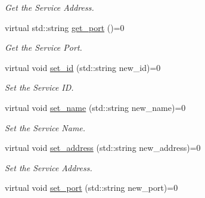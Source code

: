 \begin{DoxyCompactItemize}
\begin{DoxyCompactList}\small\item\em Get the Service Address. \end{DoxyCompactList}\item 
\hypertarget{classServiceInterface_a7c8a328711f7fb019a9f7dadcb897cb0}{virtual std\-::string \hyperlink{classServiceInterface_a7c8a328711f7fb019a9f7dadcb897cb0}{get\-\_\-port} ()=0}\label{classServiceInterface_a7c8a328711f7fb019a9f7dadcb897cb0}

\begin{DoxyCompactList}\small\item\em Get the Service Port. \end{DoxyCompactList}\item 
\hypertarget{classServiceInterface_aade793bb679fa00cd34194a3623c554a}{virtual void \hyperlink{classServiceInterface_aade793bb679fa00cd34194a3623c554a}{set\-\_\-id} (std\-::string new\-\_\-id)=0}\label{classServiceInterface_aade793bb679fa00cd34194a3623c554a}

\begin{DoxyCompactList}\small\item\em Set the Service I\-D. \end{DoxyCompactList}\item 
\hypertarget{classServiceInterface_ac9b2d1a785b665ef3c575f5877148511}{virtual void \hyperlink{classServiceInterface_ac9b2d1a785b665ef3c575f5877148511}{set\-\_\-name} (std\-::string new\-\_\-name)=0}\label{classServiceInterface_ac9b2d1a785b665ef3c575f5877148511}

\begin{DoxyCompactList}\small\item\em Set the Service Name. \end{DoxyCompactList}\item 
\hypertarget{classServiceInterface_a619fb75631f816d547d2ad3efeae2bf5}{virtual void \hyperlink{classServiceInterface_a619fb75631f816d547d2ad3efeae2bf5}{set\-\_\-address} (std\-::string new\-\_\-address)=0}\label{classServiceInterface_a619fb75631f816d547d2ad3efeae2bf5}

\begin{DoxyCompactList}\small\item\em Set the Service Address. \end{DoxyCompactList}\item 
\hypertarget{classServiceInterface_a2c9385fbc567949560dc7972e6a7059e}{virtual void \hyperlink{classServiceInterface_a2c9385fbc567949560dc7972e6a7059e}{set\-\_\-port} (std\-::string new\-\_\-port)=0}\label{classServiceInterface_a2c9385fbc567949560dc7972e6a7059e}


\end{DoxyCompactItemize}
